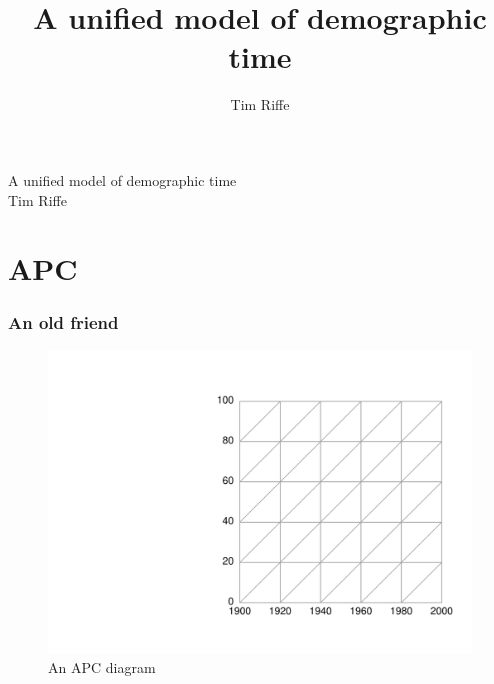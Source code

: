 \documentclass{beamer}
\title[APCTDL]{A unified model of demographic time}
\author[Riffe]
{
Tim Riffe
}
\begin{document}

\begin{frame}[plain]

\vspace{3em}
\LARGE A unified model of demographic time\\
\vspace{3 mm}
\normalsize Tim Riffe
\end{frame}



\section{APC}
\begin{frame}
\frametitle{An old friend}
\begin{figure}[b]
    \centering
    \includegraphics[scale=.7]{Figures/LabPres/APC1.pdf}
    \caption{An APC diagram}
\end{figure} 
\end{frame}
\end{document}
